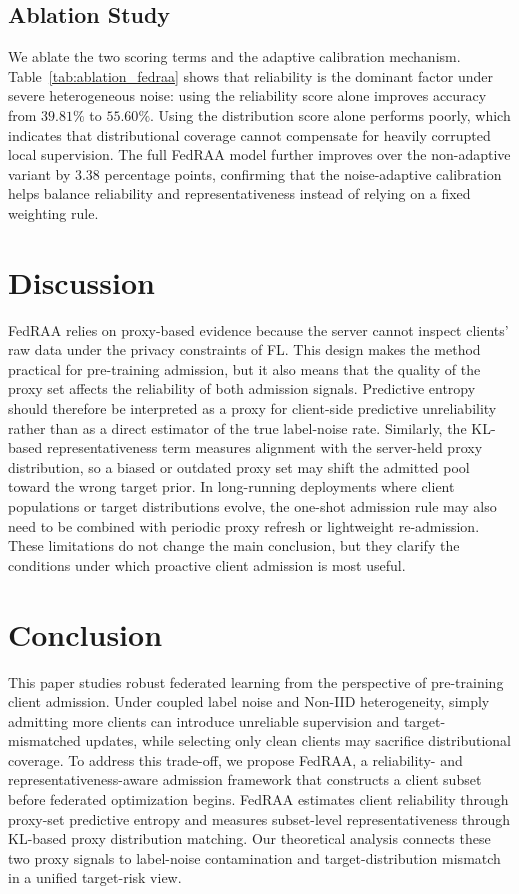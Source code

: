 \documentclass[conference]{IEEEtran}
\theoremstyle{definition}
\theoremstyle{remark}
\begin{document}
\subsection{Ablation Study}
\label{subsec:ablation}

We ablate the two scoring terms and the adaptive calibration mechanism.
Table~\ref{tab:ablation_fedraa} shows that reliability is the dominant factor under severe heterogeneous noise: using the reliability score alone improves accuracy from $39.81\%$ to $55.60\%$.
Using the distribution score alone performs poorly, which indicates that distributional coverage cannot compensate for heavily corrupted local supervision.
The full FedRAA model further improves over the non-adaptive variant by $3.38$ percentage points, confirming that the noise-adaptive calibration helps balance reliability and representativeness instead of relying on a fixed weighting rule.

\section{Discussion}

FedRAA relies on proxy-based evidence because the server cannot inspect clients' raw data under the privacy constraints of FL.
This design makes the method practical for pre-training admission, but it also means that the quality of the proxy set affects the reliability of both admission signals.
Predictive entropy should therefore be interpreted as a proxy for client-side predictive unreliability rather than as a direct estimator of the true label-noise rate.
Similarly, the KL-based representativeness term measures alignment with the server-held proxy distribution, so a biased or outdated proxy set may shift the admitted pool toward the wrong target prior.
In long-running deployments where client populations or target distributions evolve, the one-shot admission rule may also need to be combined with periodic proxy refresh or lightweight re-admission.
These limitations do not change the main conclusion, but they clarify the conditions under which proactive client admission is most useful.

\section{Conclusion}

This paper studies robust federated learning from the perspective of pre-training client admission.
Under coupled label noise and Non-IID heterogeneity, simply admitting more clients can introduce unreliable supervision and target-mismatched updates, while selecting only clean clients may sacrifice distributional coverage.
To address this trade-off, we propose FedRAA, a reliability- and representativeness-aware admission framework that constructs a client subset before federated optimization begins.
FedRAA estimates client reliability through proxy-set predictive entropy and measures subset-level representativeness through KL-based proxy distribution matching.
Our theoretical analysis connects these two proxy signals to label-noise contamination and target-distribution mismatch in a unified target-risk view.
\end{document}

